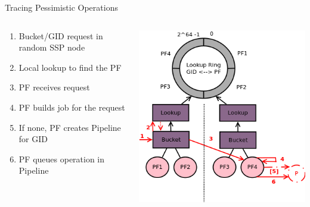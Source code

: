 \documentclass[aspectratio=169]{beamer}
\begin{document}
\begin{frame}{Tracing Pessimistic Operations}
    \begin{columns}
        \begin{column}[c]{0.5\textwidth}
            \begin{enumerate}
                \item Bucket/GID request in random SSP node
                \item Local lookup to find the PF
                \item PF receives request
                \item PF builds job for the request
                \item If none, PF creates Pipeline for GID
                \item PF queues operation in Pipeline
            \end{enumerate}
        \end{column}
        \begin{column}[c]{0.5\textwidth}
            \includegraphics[width=\textwidth]{images/tracingpessimistic.png}
        \end{column}
    \end{columns}
\end{frame}
\end{document}
